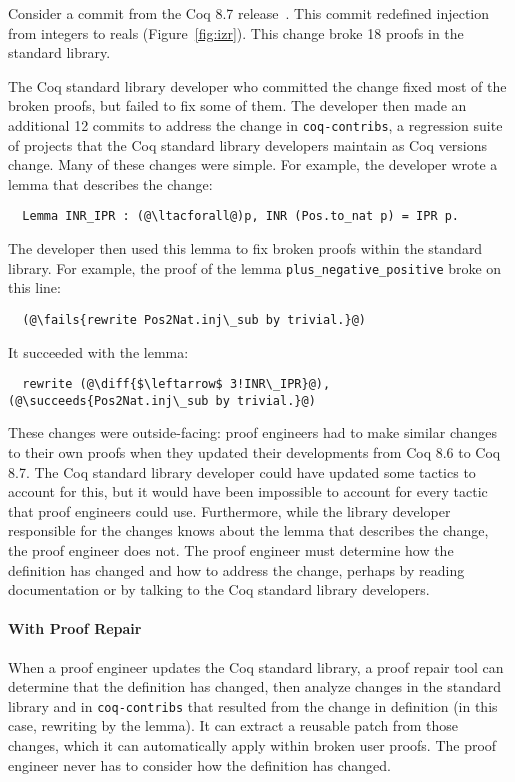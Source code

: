 Consider a commit from the Coq 8.7 release~\cite{coq87commit}. 
This commit redefined injection from integers to reals (Figure~\ref{fig:izr}).
This change broke 18 proofs in the standard library. 

The Coq standard library developer who committed the change fixed most of the broken proofs,
but failed to fix some of them. %
The developer then made an additional 12 commits to address the change in \lstinline{coq-contribs},
a regression suite of projects that the Coq standard library developers maintain as Coq versions change.
Many of these changes were simple. For example, the developer wrote a lemma that describes the change:

\lstset{language=coq, aboveskip=3pt, belowskip=3pt}
\begin{lstlisting}
  Lemma INR_IPR : (@\ltacforall@)p, INR (Pos.to_nat p) = IPR p.
\end{lstlisting}
The developer then used this lemma to fix broken proofs within the standard library. 
For example, the proof of the lemma \lstinline{plus_negative_positive} broke on this line: %

\begin{lstlisting}
  (@\fails{rewrite Pos2Nat.inj\_sub by trivial.}@)
\end{lstlisting}
It succeeded with the lemma:

\begin{lstlisting}
  rewrite (@\diff{$\leftarrow$ 3!INR\_IPR}@), (@\succeeds{Pos2Nat.inj\_sub by trivial.}@)
\end{lstlisting}

These changes were outside-facing: proof engineers had to make similar changes to their own proofs when
they updated their developments from Coq 8.6 to Coq 8.7. The Coq standard library developer could have updated some tactics to account for this, but it 
would have been impossible to account for every tactic that proof engineers could use.
Furthermore, while the library developer responsible for the changes knows about
the lemma that describes the change, the proof engineer does not. The proof engineer must determine
how the definition has changed and how to address the change, perhaps by reading documentation or by
talking to the Coq standard library developers. 

\paragraph{With Proof Repair} When a proof engineer updates the Coq standard library, a proof repair tool can determine
that the definition has changed, then analyze changes in the standard library and in \lstinline{coq-contribs}
that resulted from the change in definition (in this case, rewriting by the lemma).
It can extract a reusable patch from those changes, which it can automatically apply within broken user proofs.
The proof engineer never has to consider how the definition has changed.


